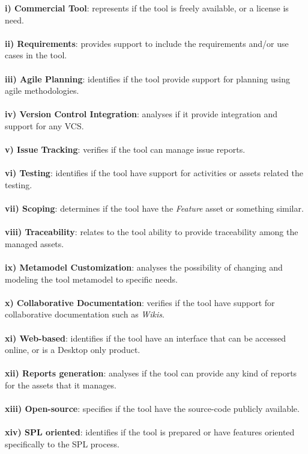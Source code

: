 \noindent\textbf{i) Commercial Tool}: represents if the tool is freely available, or a license is need.
\\
\\
\textbf{ii) Requirements}: provides support to include the requirements and/or use cases in the tool.
\\
\\
\textbf{iii) Agile Planning}: identifies if the tool provide support for planning using agile methodologies. 
\\
\\
\textbf{iv) Version Control Integration}: analyses if it provide integration and support for any \acf{VCS}.
\\
\\
\textbf{v) Issue Tracking}: verifies if the tool can manage issue reports. 
\\
\\
\textbf{vi) Testing}: identifies if the tool have support for activities or assets related the testing.
\\
\\
\textbf{vii) Scoping}: determines if the tool have the \textit{Feature} asset or something similar.
\\
\\
\textbf{viii) Traceability}: relates to the tool ability to provide traceability among the managed assets. 
\\
\\
\textbf{ix) Metamodel Customization}: analyses the possibility of changing and modeling the tool metamodel to specific needs. 
\\
\\
\textbf{x) Collaborative Documentation}: verifies if the tool have support for collaborative documentation such as \textit{Wikis}.
\\
\\
\textbf{xi) Web-based}: identifies if the tool have an interface that can be accessed online, or is a Desktop only product. 
\\
\\
\textbf{xii) Reports generation}: analyses if the tool can provide any kind of reports for the assets that it manages.
\\
\\
\textbf{xiii) Open-source}: specifies if the tool have the source-code publicly available.
\\
\\
\textbf{xiv) SPL oriented}: identifies if the tool is prepared or have features oriented specifically to the \ac{SPL} process.

